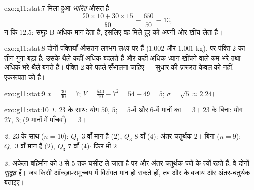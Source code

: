 \begin{solution}{exo:g11:stat:7}
मिला हुआ  \emph{भारित} औसत है
\[
\frac{20 \times 10 + 30 \times 15}{50} = \frac{650}{50} = 13,
\]
न कि $12.5$: समूह B अधिक मान देता है, इसलिए वह मिले हुए  को अपनी ओर खींच
लेता है।
\end{solution}

\begin{solution}{exo:g11:stat:8}
दोनों पंक्तियाँ औसतन लगभग लक्ष्य पर हैं ($1.002$ और $1.001$ kg), पर पंक्ति 2 का
 तीन गुना बड़ा है: उसके थैले कहीं अधिक बदलते हैं और कहीं अधिक
ध्यान खींचने वाले कम-भरे तथा अधिक-भरे थैले बनते हैं। पंक्ति 2 को पहले
सँभालना चाहिए --- सुधार की ज़रूरत केवल  को नहीं, एकरूपता को है।
\end{solution}

\begin{solution}{exo:g11:stat:9}
$\bar x = \frac{70}{10} = 7$; $V = \frac{540}{10} - 7^2 = 54 - 49 = 5$; $\sigma = \sqrt5 \approx 2.24$।
\end{solution}

\begin{solution}{exo:g11:stat:10}
\emph{1.} $23$ के साथ: योग $50$,  $5$;  = $5$-वें और $6$-वें
मानों का  $= 3$। $23$ के बिना: योग $27$,  $3$;  (9
मानों में पाँचवाँ) $= 3$।

\emph{2.} $23$ के साथ ($n = 10$): $Q_1$ $3$-वाँ मान है ($2$), $Q_3$ $8$-वाँ
($4$): अंतर-चतुर्थक  $2$। बिना ($n = 9$): $Q_1$ $3$-वाँ मान है ($2$),
$Q_3$ $7$-वाँ ($4$): फिर भी $2$।

\emph{3.} अकेला बहिर्मान  को $3$ से $5$ तक घसीट ले जाता है पर 
और अंतर-चतुर्थक  ज्यों के त्यों रहते हैं: वे दोनों \emph{सुदृढ़} हैं। जब
किसी आँकड़ा-समुच्चय में विसंगत मान हो सकते हों, तब  और  के
बजाय  और अंतर-चतुर्थक  बताइए।
\end{solution}

